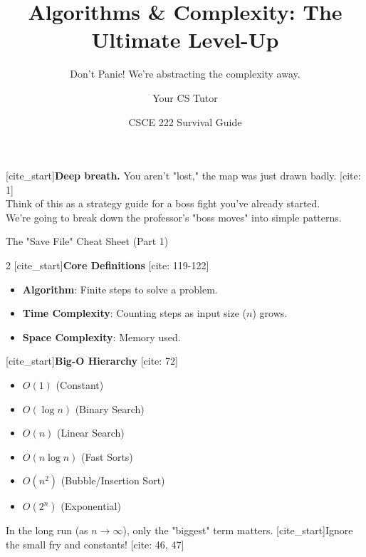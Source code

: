 \documentclass[landscape]{beamer}
\title{Algorithms \& Complexity: The Ultimate Level-Up}
\subtitle{Don't Panic! We're abstracting the complexity away.}
\author{Your CS Tutor}
\date{CSCE 222 Survival Guide}
\begin{document}
\begin{frame}
    \titlepage
    \begin{center}
        [cite_start]\textbf{Deep breath.} You aren't "lost," the map was just drawn badly. [cite: 1] \\
        Think of this as a strategy guide for a boss fight you've already started. \\
        We're going to break down the professor's "boss moves" into simple patterns.
    \end{center}
\end{frame}

\begin{frame}{The "Save File" Cheat Sheet (Part 1)}
    \begin{multicols}{2}
        [cite_start]\textbf{Core Definitions} [cite: 119-122]
        \begin{itemize}
            \item \textbf{Algorithm}: Finite steps to solve a problem.
            \item \textbf{Time Complexity}: Counting steps as input size ($n$) grows.
            \item \textbf{Space Complexity}: Memory used.
        \end{itemize}
        
        \columnbreak
        
        [cite_start]\textbf{Big-O Hierarchy} [cite: 72]
        \begin{itemize}
            \item $O(1)$ (Constant)
            \item $O(\log n)$ (Binary Search)
            \item $O(n)$ (Linear Search)
            \item $O(n \log n)$ (Fast Sorts)
            \item $O(n^2)$ (Bubble/Insertion Sort)
            \item $O(2^n)$ (Exponential)
        \end{itemize}
    \end{multicols}
    \begin{tcolorbox}[colback=blue!5,colframe=blue!75,title=Pro-Tip]
        In the long run (as $n \to \infty$), only the "biggest" term matters. [cite_start]Ignore the small fry and constants! [cite: 46, 47]
    \end{tcolorbox}
\end{frame}
\end{document}
